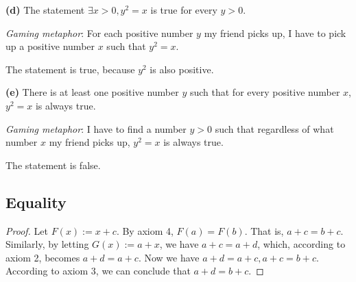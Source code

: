\textbf{(d)} The statement $\exists x > 0, y^2=x$ is true for every $y>0$.

\emph{Gaming metaphor}: For each positive number $y$ my friend picks up, I have to pick up a positive 
number $x$ such that $y^2=x$.

The statement is true, because $y^2$ is also positive.

\textbf{(e)} There is at least one positive number $y$ such that for every positive number $x$, $y^2=x$ 
is always true.

\emph{Gaming metaphor}: I have to find a number $y>0$ such that regardless of what number $x$ my friend 
picks up, $y^2=x$ is always true.

The statement is false.

\subsection{Equality}
\begin{proof}
Let $F(x) := x+c$. By axiom 4, $F(a)=F(b)$. That is, $a+c=b+c$. Similarly, by letting $G(x) := a+x$, 
we have $a+c=a+d$, which, according to axiom 2, becomes $a+d=a+c$. Now we have $a+d=a+c, a+c=b+c$. 
According to axiom 3, we can conclude that $a+d=b+c$.
\end{proof}